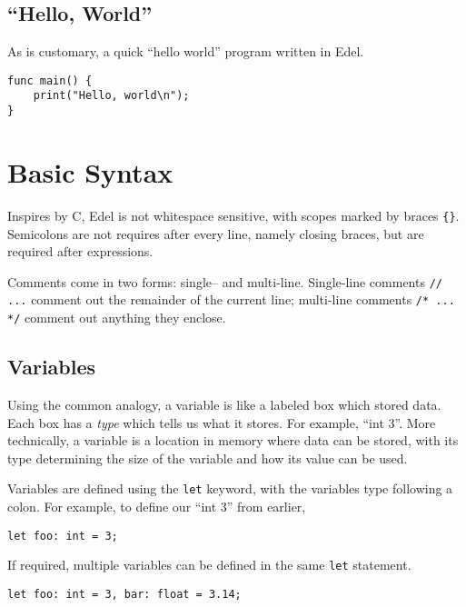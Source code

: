 \documentclass{article}
\begin{document}
    \subsection{``Hello, World''}\label{subsec:hello-world}

    As is customary, a quick ``hello world'' program written in Edel.

    \begin{lstlisting}[language=CustomLang]
func main() {
    print("Hello, world\n");
}
    \end{lstlisting}

    \section{Basic Syntax}\label{sec:basic-syntax}

    Inspires by C, Edel is not whitespace sensitive, with scopes marked by braces \texttt{\{\}}.
    Semicolons are not requires after every line, namely closing braces, but are required after expressions.

    Comments come in two forms: single-- and multi-line.
    Single-line comments \texttt{// ...} comment out the remainder of the current line;
    multi-line comments \texttt{/* ... */} comment out anything they enclose.

    \subsection{Variables}\label{subsec:variables-&-assignment}

    Using the common analogy, a variable is like a labeled box which stored data.
    Each box has a \textit{type} which tells us what it stores.
    For example, ``int 3''.
    More technically, a variable is a location in memory where data can be stored, with its type determining the size of the variable and how its value can be used.

    Variables are defined using the \texttt{let} keyword, with the variables type following a colon.
    For example, to define our ``int 3'' from earlier,
    \begin{lstlisting}[language=CustomLang]
let foo: int = 3;
    \end{lstlisting}

    If required, multiple variables can be defined in the same \texttt{let} statement.
    \begin{lstlisting}[language=CustomLang]
let foo: int = 3, bar: float = 3.14;
    \end{lstlisting}
\end{document}
